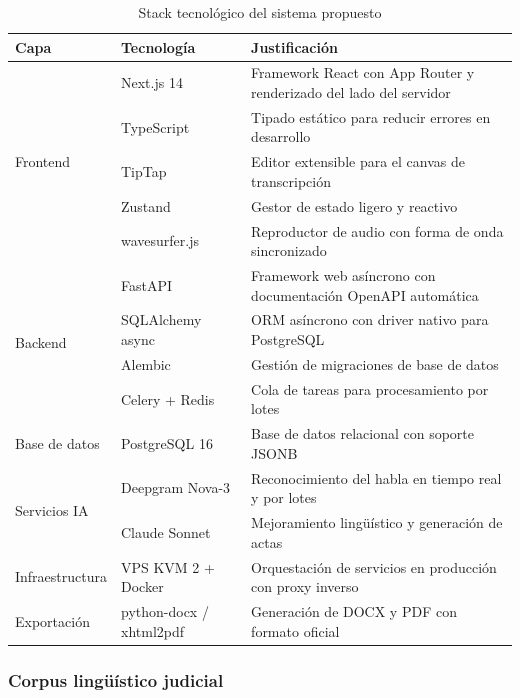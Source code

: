 \documentclass[12pt,a4paper,oneside]{article}
\begin{document}
\begin{table}[H]
\centering
\small
\caption{Stack tecnol\'ogico del sistema propuesto}
\begin{tabular}{|p{2.2cm}|p{3.2cm}|p{7cm}|}
\hline
\rowcolor{gray!20}
\textbf{Capa} & \textbf{Tecnolog\'ia} & \textbf{Justificaci\'on} \\
\hline
\multirow{5}{2.2cm}{Frontend} & Next.js 14 & Framework React con App Router y renderizado del lado del servidor \\
\cline{2-3}
& TypeScript & Tipado est\'atico para reducir errores en desarrollo \\
\cline{2-3}
& TipTap & Editor extensible para el canvas de transcripci\'on \\
\cline{2-3}
& Zustand & Gestor de estado ligero y reactivo \\
\cline{2-3}
& wavesurfer.js & Reproductor de audio con forma de onda sincronizado \\
\hline
\multirow{4}{2.2cm}{Backend} & FastAPI & Framework web as\'incrono con documentaci\'on OpenAPI autom\'atica \\
\cline{2-3}
& SQLAlchemy async & ORM as\'incrono con driver nativo para PostgreSQL \\
\cline{2-3}
& Alembic & Gesti\'on de migraciones de base de datos \\
\cline{2-3}
& Celery + Redis & Cola de tareas para procesamiento por lotes \\
\hline
Base de datos & PostgreSQL 16 & Base de datos relacional con soporte JSONB \\
\hline
\multirow{2}{2.2cm}{Servicios IA} & Deepgram Nova-3 & Reconocimiento del habla en tiempo real y por lotes \\
\cline{2-3}
& Claude Sonnet & Mejoramiento ling\"u\'istico y generaci\'on de actas \\
\hline
Infraestructura & VPS KVM 2 + Docker & Orquestaci\'on de servicios en producci\'on con proxy inverso \\
\hline
Exportaci\'on & python-docx / xhtml2pdf & Generaci\'on de DOCX y PDF con formato oficial \\
\hline
\end{tabular}
\label{tab:stack}
\end{table}

\subsubsection{Corpus ling\"u\'istico judicial}
\end{document}
